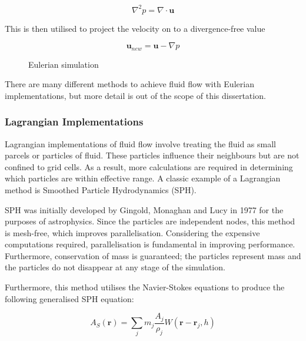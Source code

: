\documentclass[a4paper, 12pt]{article}
\newcommand{\wideimage}[2][]{%
  \makebox[\textwidth][c]{\texttt{[image: \#2]}}%
}
\begin{document}
    \begin{equation}
        \nabla^2{p} = \nabla \cdot \textbf{u}
    \end{equation} 
    
    This is then utilised to project the velocity on to a divergence-free value
    
    \begin{equation}
        \textbf{u}_{new} = \textbf{u} - \nabla{p}
    \end{equation}

    \begin{figure}[H]
        \begin{center}
            \wideimage[width=0.7\textwidth]{eulerianEG.png}
            \caption{Eulerian simulation \cite{eulerianeg}}
        \end{center}
    \end{figure}

    There are many different methods to achieve fluid flow with Eulerian implementations, but more detail is out of the scope of this dissertation.

    \subsubsection{Lagrangian Implementations}

    Lagrangian implementations of fluid flow involve treating the fluid as small parcels or particles of fluid. These particles influence their neighbours but are not confined to grid cells. As a result, more calculations are required in determining which particles are within effective range. A classic example of a Lagrangian method is Smoothed Particle Hydrodynamics (SPH).

    SPH was initially developed by Gingold, Monaghan and Lucy in 1977 for the purposes of astrophysics\cite{sca}. Since the particles are independent nodes, this method is mesh-free, which improves parallelisation. Considering the expensive computations required, parallelisation is fundamental in improving performance. Furthermore, conservation of mass is guaranteed; the particles represent mass and the particles do not disappear at any stage of the simulation.

    Furthermore, this method utilises the Navier-Stokes equations to produce the following generalised SPH equation:

    \begin{equation}
        A_S(\textbf{r}) = \sum_{j}{m_j \frac{A_j}{\rho_j}W(\textbf{r} - \textbf{r}_j, h)}
    \end{equation}
\end{document}
